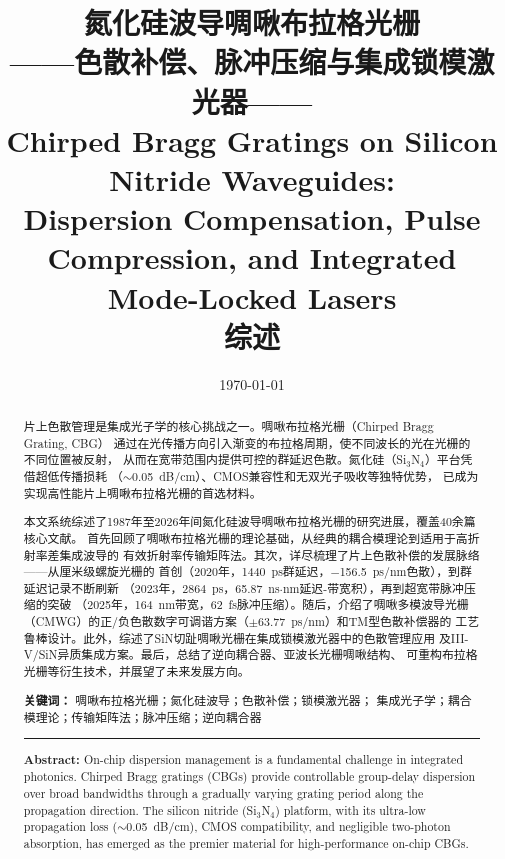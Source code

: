 \documentclass[12pt,a4paper,twoside]{article}
\begin{document}
\title{
  {\Huge \textbf{氮化硅波导啁啾布拉格光栅}}\\[6pt]
  {\Large ——色散补偿、脉冲压缩与集成锁模激光器——}\\[16pt]
  {\large Chirped Bragg Gratings on Silicon Nitride Waveguides:}\\[3pt]
  {\large Dispersion Compensation, Pulse Compression, and Integrated}\\[3pt]
  {\large Mode-Locked Lasers}\\[20pt]
  {\normalsize 综\quad 述}
}
\author{}
\date{\today}
\maketitle

\begin{abstract}
\noindent
片上色散管理是集成光子学的核心挑战之一。啁啾布拉格光栅（Chirped Bragg Grating, CBG）
通过在光传播方向引入渐变的布拉格周期，使不同波长的光在光栅的不同位置被反射，
从而在宽带范围内提供可控的群延迟色散。氮化硅（Si$_3$N$_4$）平台凭借超低传播损耗
（$\sim$\SI{0.05}{dB/cm}）、CMOS兼容性和无双光子吸收等独特优势，
已成为实现高性能片上啁啾布拉格光栅的首选材料。

本文系统综述了1987年至2026年间氮化硅波导啁啾布拉格光栅的研究进展，覆盖40余篇核心文献。
首先回顾了啁啾布拉格光栅的理论基础，从经典的耦合模理论到适用于高折射率差集成波导的
有效折射率传输矩阵法。其次，详尽梳理了片上色散补偿的发展脉络——从厘米级螺旋光栅的
首创（2020年，1440~ps群延迟，$-$156.5~ps/nm色散），到群延迟记录不断刷新
（2023年，2864~ps，65.87~ns$\cdot$nm延迟-带宽积），再到超宽带脉冲压缩的突破
（2025年，164~nm带宽，62~fs脉冲压缩）。随后，介绍了啁啾多模波导光栅
（CMWG）的正/负色散数字可调谐方案（$\pm$63.77~ps/nm）和TM型色散补偿器的
工艺鲁棒设计。此外，综述了SiN切趾啁啾光栅在集成锁模激光器中的色散管理应用
及III-V/SiN异质集成方案。最后，总结了逆向耦合器、亚波长光栅啁啾结构、
可重构布拉格光栅等衍生技术，并展望了未来发展方向。

\textbf{关键词：} 啁啾布拉格光栅；氮化硅波导；色散补偿；锁模激光器；
集成光子学；耦合模理论；传输矩阵法；脉冲压缩；逆向耦合器

\vspace{10pt}
\hrule
\vspace{8pt}

\noindent\textbf{Abstract:}
On-chip dispersion management is a fundamental challenge in integrated photonics.
Chirped Bragg gratings (CBGs) provide controllable group-delay dispersion over
broad bandwidths through a gradually varying grating period along the propagation
direction. The silicon nitride (Si$_3$N$_4$) platform, with its ultra-low
propagation loss ($\sim$\SI{0.05}{dB/cm}), CMOS compatibility, and negligible
two-photon absorption, has emerged as the premier material for high-performance
on-chip CBGs.


\end{abstract}
\end{document}
